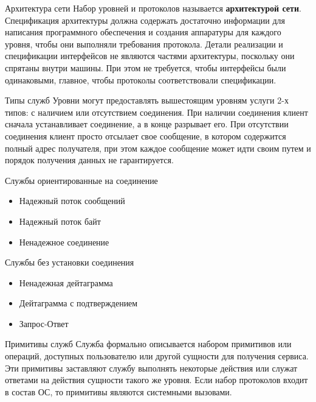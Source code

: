 \begin{frame}{Архитектура сети}
	Набор уровней и протоколов называется {\bfseries архитектурой сети}.
	Спецификация архитектуры должна содержать достаточно информации для написания программного обеспечения и создания аппаратуры для каждого уровня,  чтобы они выполняли требования протокола. Детали реализации и спецификации интерфейсов не являются частями архитектуры,  поскольку они спрятаны внутри машины. При этом не требуется,  чтобы интерфейсы были одинаковыми,  главное,  чтобы протоколы соответствовали спецификации.
\end{frame}

\begin{frame}{Типы служб}
Уровни  могут предоставлять вышестоящим уровням услуги 2-х типов: с наличием или отсутствием соединения.
При наличии соединения клиент сначала устанавливает соединение,  а в конце разрывает его.
При отсутствии соединения клиент просто отсылает свое сообщение,  в котором содержится полный адрес получателя,  при этом каждое сообщение может идти своим путем и порядок получения данных не гарантируется.
\end{frame}

\begin{frame}{Службы ориентированные на соединение}
	\begin{itemize}
		\item Надежный поток сообщений
		\item Надежный поток байт
		\item Ненадежное соединение
	\end{itemize}
\end{frame}

\begin{frame}{Службы без установки соединения}
	\begin{itemize}
		\item Ненадежная дейтаграмма
		\item Дейтаграмма с подтверждением
		\item Запрос-Ответ
	\end{itemize}
\end{frame}

\begin{frame}{Примитивы служб}
	Служба формально описывается набором примитивов или операций,  доступных пользователю или другой сущности для получения сервиса. Эти примитивы заставляют службу выполнять некоторые действия или служат ответами на действия сущности такого же уровня. Если набор протоколов входит в состав ОС,  то примитивы являются системными вызовами.
\end{frame}

